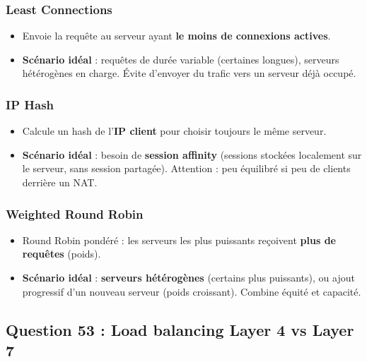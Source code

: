 \documentclass[12pt,a4paper]{article}
\begin{document}
\subsubsection*{Least Connections}
\begin{itemize}
  \item Envoie la requ\^ete au serveur ayant \textbf{le moins de connexions actives}.
  \item \textbf{Sc\'enario id\'eal} : requ\^etes de dur\'ee variable (certaines longues), serveurs h\'et\'erog\`enes en charge. \'Evite d'envoyer du trafic vers un serveur d\'ej\`a occup\'e.
\end{itemize}

\subsubsection*{IP Hash}
\begin{itemize}
  \item Calcule un hash de l'\textbf{IP client} pour choisir toujours le m\^eme serveur.
  \item \textbf{Sc\'enario id\'eal} : besoin de \textbf{session affinity} (sessions stock\'ees localement sur le serveur, sans session partag\'ee). Attention : peu \'equilibr\'e si peu de clients derri\`ere un NAT.
\end{itemize}

\subsubsection*{Weighted Round Robin}
\begin{itemize}
  \item Round Robin pond\'er\'e : les serveurs les plus puissants re\c{c}oivent \textbf{plus de requ\^etes} (poids).
  \item \textbf{Sc\'enario id\'eal} : \textbf{serveurs h\'et\'erog\`enes} (certains plus puissants), ou ajout progressif d'un nouveau serveur (poids croissant). Combine \'equit\'e et capacit\'e.
\end{itemize}

\subsection*{Question 53 : Load balancing Layer 4 vs Layer 7}
\end{document}
